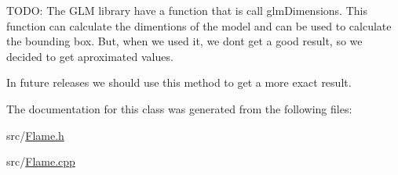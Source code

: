 TODO: The GLM library have a function that is call glmDimensions. This function can calculate the dimentions of the model and can be used to calculate the bounding box. But, when we used it, we dont get a good result, so we decided to get aproximated values.

In future releases we should use this method to get a more exact result.



The documentation for this class was generated from the following files:\begin{DoxyCompactItemize}
\item 
src/\hyperlink{Flame_8h}{Flame.h}\item 
src/\hyperlink{Flame_8cpp}{Flame.cpp}\end{DoxyCompactItemize}
